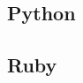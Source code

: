 \documentclass{KodeBook}
\begin{document}
%

\subsection{Python}

%

\subsection{Ruby}

%


%
%
%
%
%
%
%
%
%
%
%
%
%
%
%
%
%
%
\end{document}
